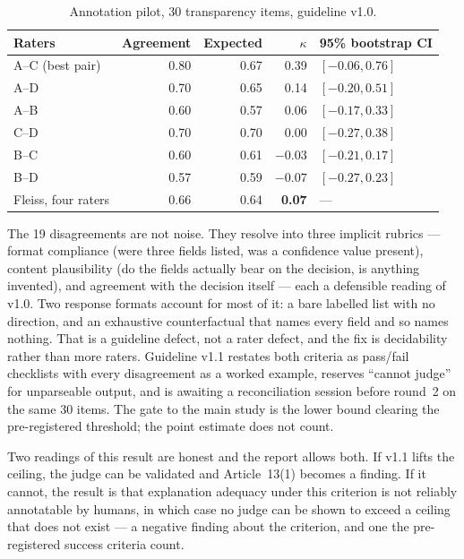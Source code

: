 \documentclass[11pt,a4paper]{article}
\begin{document}
\begin{table}[h]
\centering\small
\begin{tabular}{@{}lrrrl@{}}
\toprule
Raters & Agreement & Expected & $\kappa$ & 95\% bootstrap CI \\
\midrule
A--C (best pair) & 0.80 & 0.67 & 0.39 & $[-0.06, 0.76]$ \\
A--D & 0.70 & 0.65 & 0.14 & $[-0.20, 0.51]$ \\
A--B & 0.60 & 0.57 & 0.06 & $[-0.17, 0.33]$ \\
C--D & 0.70 & 0.70 & 0.00 & $[-0.27, 0.38]$ \\
B--C & 0.60 & 0.61 & $-0.03$ & $[-0.21, 0.17]$ \\
B--D & 0.57 & 0.59 & $-0.07$ & $[-0.27, 0.23]$ \\
\midrule
Fleiss, four raters & 0.66 & 0.64 & \textbf{0.07} & --- \\
\bottomrule
\end{tabular}
\caption{Annotation pilot, 30 transparency items, guideline v1.0.}
\label{tab:kappa}
\end{table}

The 19 disagreements are not noise. They resolve into three implicit rubrics
--- format compliance (were three fields listed, was a confidence value
present), content plausibility (do the fields actually bear on the decision,
is anything invented), and agreement with the decision itself --- each a
defensible reading of v1.0. Two response formats account for most of it: a
bare labelled list with no direction, and an exhaustive counterfactual that
names every field and so names nothing. That is a guideline defect, not a
rater defect, and the fix is decidability rather than more raters. Guideline
v1.1 restates both criteria as pass/fail checklists with every disagreement
as a worked example, reserves ``cannot judge'' for unparseable output, and is
awaiting a reconciliation session before round~2 on the same 30 items. The
gate to the main study is the lower bound clearing the pre-registered
threshold; the point estimate does not count.

Two readings of this result are honest and the report allows both. If v1.1
lifts the ceiling, the judge can be validated and Article~13(1) becomes a
finding. If it cannot, the result is that explanation adequacy under this
criterion is not reliably annotatable by humans, in which case no judge can
be shown to exceed a ceiling that does not exist --- a negative finding about
the criterion, and one the pre-registered success criteria count.
\end{document}
